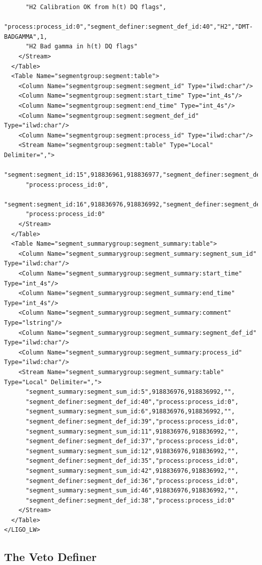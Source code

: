 {\begin{verbatim}
      "H2 Calibration OK from h(t) DQ flags",
      "process:process_id:0","segment_definer:segment_def_id:40","H2","DMT-BADGAMMA",1,
      "H2 Bad gamma in h(t) DQ flags"
    </Stream>
  </Table>
  <Table Name="segmentgroup:segment:table">
    <Column Name="segmentgroup:segment:segment_id" Type="ilwd:char"/>
    <Column Name="segmentgroup:segment:start_time" Type="int_4s"/>
    <Column Name="segmentgroup:segment:end_time" Type="int_4s"/>
    <Column Name="segmentgroup:segment:segment_def_id" Type="ilwd:char"/>
    <Column Name="segmentgroup:segment:process_id" Type="ilwd:char"/>
    <Stream Name="segmentgroup:segment:table" Type="Local" Delimiter=",">
      "segment:segment_id:15",918836961,918836977,"segment_definer:segment_def_id:35",
      "process:process_id:0",
      "segment:segment_id:16",918836976,918836992,"segment_definer:segment_def_id:37",
      "process:process_id:0"
    </Stream>
  </Table>
  <Table Name="segment_summarygroup:segment_summary:table">
    <Column Name="segment_summarygroup:segment_summary:segment_sum_id" Type="ilwd:char"/>
    <Column Name="segment_summarygroup:segment_summary:start_time" Type="int_4s"/>
    <Column Name="segment_summarygroup:segment_summary:end_time" Type="int_4s"/>
    <Column Name="segment_summarygroup:segment_summary:comment" Type="lstring"/>
    <Column Name="segment_summarygroup:segment_summary:segment_def_id" Type="ilwd:char"/>
    <Column Name="segment_summarygroup:segment_summary:process_id" Type="ilwd:char"/>
    <Stream Name="segment_summarygroup:segment_summary:table" Type="Local" Delimiter=",">
      "segment_summary:segment_sum_id:5",918836976,918836992,"",
      "segment_definer:segment_def_id:40","process:process_id:0",
      "segment_summary:segment_sum_id:6",918836976,918836992,"",
      "segment_definer:segment_def_id:39","process:process_id:0",
      "segment_summary:segment_sum_id:11",918836976,918836992,"",
      "segment_definer:segment_def_id:37","process:process_id:0",
      "segment_summary:segment_sum_id:12",918836976,918836992,"",
      "segment_definer:segment_def_id:35","process:process_id:0",
      "segment_summary:segment_sum_id:42",918836976,918836992,"",
      "segment_definer:segment_def_id:36","process:process_id:0",
      "segment_summary:segment_sum_id:46",918836976,918836992,"",
      "segment_definer:segment_def_id:38","process:process_id:0"
    </Stream>
  </Table>
</LIGO_LW>
\end{verbatim}
}

\subsection{The Veto Definer}
\label{sec:veto_definer}

